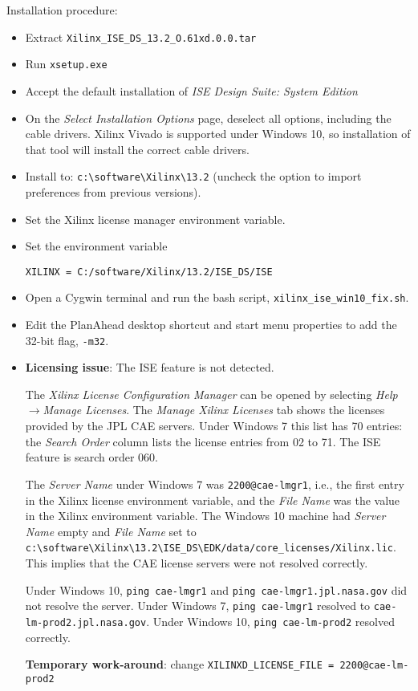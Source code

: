 \documentclass[10pt,twoside]{article}
\begin{document}
Installation procedure:
%
\begin{itemize}
\item Extract \verb+Xilinx_ISE_DS_13.2_O.61xd.0.0.tar+
\item Run \verb+xsetup.exe+
\item Accept the default installation of \emph{ISE Design Suite: System Edition}
\item On the \emph{Select Installation Options} page, deselect all options,
including the cable drivers. Xilinx Vivado is supported under Windows 10, so
installation of that tool will install the correct cable drivers.
\item Install to: \verb+c:\software\Xilinx\13.2+ (uncheck the option to
import preferences from previous versions).
\item Set the Xilinx license manager environment variable.
\item Set the environment variable

\verb+XILINX = C:/software/Xilinx/13.2/ISE_DS/ISE+

\item Open a Cygwin terminal and run the bash
script, \verb+xilinx_ise_win10_fix.sh+.
\item Edit the PlanAhead desktop shortcut and start menu properties to add the 32-bit flag, \verb+-m32+.

\item {\bf Licensing issue}: The ISE feature is not detected.

The \emph{Xilinx License Configuration Manager} can be opened by
selecting \emph{Help}$\rightarrow$\emph{Manage Licenses}. The
\emph{Manage Xilinx Licenses} tab shows the licenses provided
by the JPL CAE servers. Under Windows 7 this list has 70 entries:
the \emph{Search Order} column lists the license entries from 02 to 71.
The ISE feature is search order 060.

The \emph{Server Name} under Windows 7 was \verb+2200@cae-lmgr1+, i.e., the
first entry in the Xilinx license environment variable, and
the \emph{File Name} was the value in the Xilinx environment variable. The
Windows 10 machine had  \emph{Server Name} empty and
\emph{File Name} set to \verb+c:\software\Xilinx\13.2\ISE_DS\EDK/data/core_licenses/Xilinx.lic+.
This implies that the CAE license servers were not resolved correctly.

Under Windows 10,
\verb+ping cae-lmgr1+ and \verb+ping cae-lmgr1.jpl.nasa.gov+ did not
resolve the server.
Under Windows 7,
\verb+ping cae-lmgr1+ resolved to \verb+cae-lm-prod2.jpl.nasa.gov+.
Under Windows 10,
\verb+ping cae-lm-prod2+ resolved correctly.

{\bf Temporary work-around}: change \verb+XILINXD_LICENSE_FILE = 2200@cae-lm-prod2+

\end{itemize}
\end{document}
